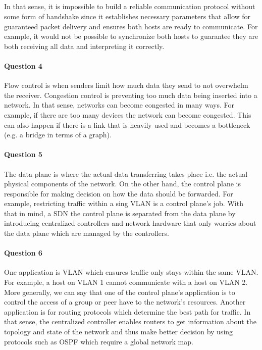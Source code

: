\documentclass[12pt]{article}
\begin{document}
\subparagraph*{}
In that sense, it is impossible to build a reliable communication protocol without some form of
handshake since it establishes necessary parameters that allow for guaranteed packet delivery
and ensures both hosts are ready to communicate. For example, it would not be possible to
synchronize both hosts to guarantee they are both receiving all data and interpreting it
correctly.

\paragraph*{Question 4}
Flow control is when senders limit how much data they send to not overwhelm the receiver. Congestion
control is preventing too much data being inserted into a network. In that sense, networks can
become congested in many ways. For example, if there are too many devices the network can become
congested. This can also happen if there is a link that is heavily used and becomes a bottleneck
(e.g. a bridge in terms of a graph).

\pagebreak

\paragraph*{Question 5}
The data plane is where the actual data transferring takes place i.e. the actual physical components
of the network. On the other hand, the control plane is responsible for making decision on how the
data should be forwarded. For example, restricting traffic within a sing VLAN is a control plane's
job. With that in mind, a SDN the control plane is separated from the data plane by introducing
centralized controllers and network hardware that only worries about the data plane which are managed
by the controllers.

\paragraph*{Question 6}
One application is VLAN which ensures traffic only stays within the same VLAN. For example, a host
on VLAN 1 cannot communicate with a host on VLAN 2. More generally, we can say that one of the control
plane's application is to control the access of a group or peer have to the network's resources.
Another application is for routing protocols which determine the best path for traffic. In that sense, 
the centralized controller enables routers to get information about the topology and state of the
network and thus make better decision by using protocols such as OSPF which require a global
network map.
\end{document}
